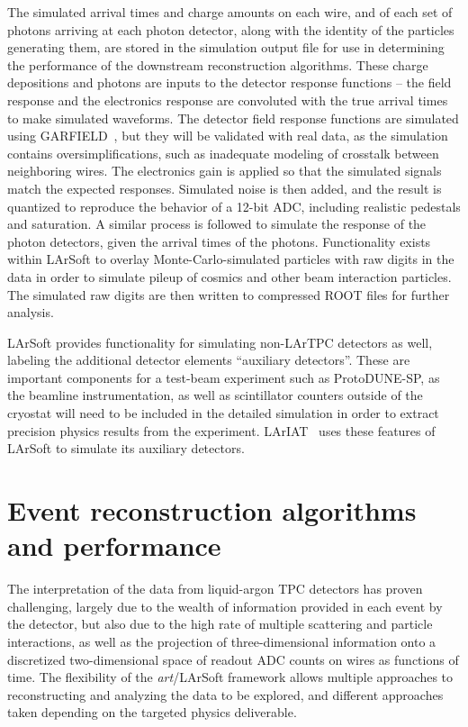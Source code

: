 The simulated arrival times and charge amounts on each wire, and of
each set of photons arriving at each photon detector, along with the
identity of the particles generating them, are stored in the
simulation output file for use in determining the performance of the
downstream reconstruction algorithms.  These charge depositions and
photons are inputs to the detector response functions -- the field
response and the electronics response are convoluted with the true
arrival times to make simulated waveforms.  The detector field
response functions are simulated using GARFIELD~\cite{garfield}, but
they will be validated with real data, as the simulation contains
oversimplifications, such as inadequate modeling of crosstalk between
neighboring wires.  The electronics gain is applied so that the
simulated signals match the expected responses.  Simulated noise is
then added, and the result is quantized to reproduce the behavior of a
12-bit ADC, including realistic pedestals and saturation.  A similar
process is followed to simulate the response of the photon detectors,
given the arrival times of the photons.  Functionality exists within
LArSoft to overlay Monte-Carlo-simulated particles with raw digits in
the data in order to simulate pileup of cosmics and other beam
interaction particles. The simulated raw digits are then written to
compressed ROOT files for further analysis.

LArSoft provides functionality for simulating non-LArTPC detectors as
well, labeling the additional detector elements ``auxiliary
detectors''.  These are important components for a test-beam
experiment such as ProtoDUNE-SP, as the beamline instrumentation, as
well as scintillator counters outside of the cryostat will need to be
included in the detailed simulation in order to extract precision
physics results from the experiment.  LArIAT~\cite{lariat} uses these
features of LArSoft to simulate its auxiliary detectors.

\section{Event reconstruction algorithms and performance}
\label{sec:larsoftreco}

The interpretation of the data from liquid-argon TPC detectors has
proven challenging, largely due to the wealth of information provided
in each event by the detector, but also due to the high rate of
multiple scattering and particle interactions, as well as the
projection of three-dimensional information onto a discretized
two-dimensional space of readout ADC counts on wires as functions of
time.  The flexibility of the {\it{art}}/LArSoft framework allows
multiple approaches to reconstructing and analyzing the data to be
explored, and different approaches taken depending on the targeted
physics deliverable.


